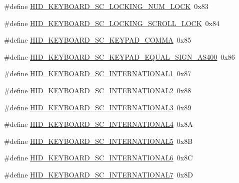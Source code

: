 \begin{DoxyCompactItemize}
\#define \hyperlink{group__Group__USBClassHIDCommon_ga82750de5b9fec7a227ce93a63b399261}{H\+I\+D\+\_\+\+K\+E\+Y\+B\+O\+A\+R\+D\+\_\+\+S\+C\+\_\+\+L\+O\+C\+K\+I\+N\+G\+\_\+\+N\+U\+M\+\_\+\+L\+O\+CK}~0x83
\item 
\#define \hyperlink{group__Group__USBClassHIDCommon_gaa020c5d57e697a6c84c277ede64fbb45}{H\+I\+D\+\_\+\+K\+E\+Y\+B\+O\+A\+R\+D\+\_\+\+S\+C\+\_\+\+L\+O\+C\+K\+I\+N\+G\+\_\+\+S\+C\+R\+O\+L\+L\+\_\+\+L\+O\+CK}~0x84
\item 
\#define \hyperlink{group__Group__USBClassHIDCommon_gabb7863bfb26167a3833af5a5f0851f01}{H\+I\+D\+\_\+\+K\+E\+Y\+B\+O\+A\+R\+D\+\_\+\+S\+C\+\_\+\+K\+E\+Y\+P\+A\+D\+\_\+\+C\+O\+M\+MA}~0x85
\item 
\#define \hyperlink{group__Group__USBClassHIDCommon_gacaed5e919724d4b44dcfa857becb487e}{H\+I\+D\+\_\+\+K\+E\+Y\+B\+O\+A\+R\+D\+\_\+\+S\+C\+\_\+\+K\+E\+Y\+P\+A\+D\+\_\+\+E\+Q\+U\+A\+L\+\_\+\+S\+I\+G\+N\+\_\+\+A\+S400}~0x86
\item 
\#define \hyperlink{group__Group__USBClassHIDCommon_ga07bd8b541b5c80b9b993200f1435027c}{H\+I\+D\+\_\+\+K\+E\+Y\+B\+O\+A\+R\+D\+\_\+\+S\+C\+\_\+\+I\+N\+T\+E\+R\+N\+A\+T\+I\+O\+N\+A\+L1}~0x87
\item 
\#define \hyperlink{group__Group__USBClassHIDCommon_ga2ef84ec0edcb0c61e42f9805ea655929}{H\+I\+D\+\_\+\+K\+E\+Y\+B\+O\+A\+R\+D\+\_\+\+S\+C\+\_\+\+I\+N\+T\+E\+R\+N\+A\+T\+I\+O\+N\+A\+L2}~0x88
\item 
\#define \hyperlink{group__Group__USBClassHIDCommon_ga35db5d0fed5cdd792b6505ab347fea78}{H\+I\+D\+\_\+\+K\+E\+Y\+B\+O\+A\+R\+D\+\_\+\+S\+C\+\_\+\+I\+N\+T\+E\+R\+N\+A\+T\+I\+O\+N\+A\+L3}~0x89
\item 
\#define \hyperlink{group__Group__USBClassHIDCommon_ga54c2a2eec1941866e95c39a34aa6284b}{H\+I\+D\+\_\+\+K\+E\+Y\+B\+O\+A\+R\+D\+\_\+\+S\+C\+\_\+\+I\+N\+T\+E\+R\+N\+A\+T\+I\+O\+N\+A\+L4}~0x8A
\item 
\#define \hyperlink{group__Group__USBClassHIDCommon_ga655c11c6fec809f9eb70d41c26fb656e}{H\+I\+D\+\_\+\+K\+E\+Y\+B\+O\+A\+R\+D\+\_\+\+S\+C\+\_\+\+I\+N\+T\+E\+R\+N\+A\+T\+I\+O\+N\+A\+L5}~0x8B
\item 
\#define \hyperlink{group__Group__USBClassHIDCommon_ga8765122411327d905ee9680194019797}{H\+I\+D\+\_\+\+K\+E\+Y\+B\+O\+A\+R\+D\+\_\+\+S\+C\+\_\+\+I\+N\+T\+E\+R\+N\+A\+T\+I\+O\+N\+A\+L6}~0x8C
\item 
\#define \hyperlink{group__Group__USBClassHIDCommon_gae1002b271d63ec2e1c996bc7d0a4fc11}{H\+I\+D\+\_\+\+K\+E\+Y\+B\+O\+A\+R\+D\+\_\+\+S\+C\+\_\+\+I\+N\+T\+E\+R\+N\+A\+T\+I\+O\+N\+A\+L7}~0x8D

\end{DoxyCompactItemize}
